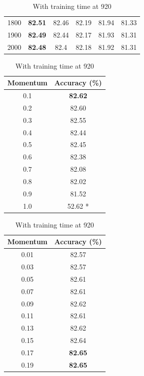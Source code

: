 \documentclass[12pt]{article}
\begin{document}
\begin{table}[H]
\begin{subtable}{.49\linewidth}
\begin{tabular}{c|ccccc}
            1800  & \textbf{82.51} & 82.46 & 82.19 & 81.94 & 81.33 \\
            1900  & \textbf{82.49} & 82.44 & 82.17 & 81.93 & 81.31 \\
            2000  & \textbf{82.48} & 82.4  & 82.18 & 81.92 & 81.31 \\
            \bottomrule
          \end{tabular}
          \label{tab:ann-m-a}
        \end{subtable}
        \begin{subtable}{.49\linewidth}
          \centering
          \caption{With training time at 920}
          \begin{tabular}{c|c}
            \toprule
            \multicolumn{1}{l|}{Momentum} & \multicolumn{1}{l}{Accuracy (\%)} \\
            \midrule
            0.1   & \textbf{82.62} \\
            0.2   & 82.60 \\
            0.3   & 82.55 \\
            0.4   & 82.44 \\
            0.5   & 82.45 \\
            0.6   & 82.38 \\
            0.7   & 82.08 \\
            0.8   & 82.02 \\
            0.9   & 81.52 \\
            1.0   & 52.62 * \\
            \bottomrule
          \end{tabular}
          \label{tab:ann-m-b}
        \end{subtable}
        \begin{subtable}{.49\linewidth}
          \centering
          \caption{With training time at 920}
            \begin{tabular}{c|c}
              \toprule
              \multicolumn{1}{l|}{Momentum} & \multicolumn{1}{l}{Accuracy (\%)} \\
              \midrule
              0.01  & 82.57 \\
              0.03  & 82.57 \\
              0.05  & 82.61 \\
              0.07  & 82.61 \\
              0.09  & 82.62 \\
              0.11  & 82.61 \\
              0.13  & 82.62 \\
              0.15  & 82.64 \\
              0.17  & \textbf{82.65} \\
              0.19  & \textbf{82.65} \\
              \bottomrule
            \end{tabular}%
            \label{tab:ann-m-c}
        \end{subtable}
        \label{tab:ann-m}
      \end{table}
      \doublespacing
\end{document}
